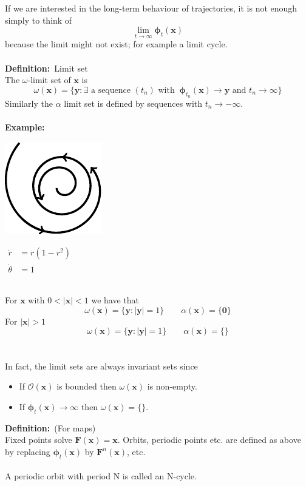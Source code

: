 \documentclass{article}
\newcommand{\cO}{\mathcal{O}}                               %
\newcommand{\example}{\textbf{Example:}}                    %
\newcommand{\definition}{\textbf{Definition:}}              %
\newcommand{\bp}{\bm{\phi}}                                 %
\begin{document}
\noindent If we are interested in the long-term behaviour of trajectories, it is not 
enough simply to think of 
\[ \lim_{t \to \infty} \bp_t(\bm{x}) \]
because the limit might not exist; for example a limit cycle.
\\
\\
\definition\ Limit set
\\
The $\omega$-limit set of $\bm{x}$ is 
\[ \omega (\bm{x}) = \{ \bm{y} : \exists \mbox{ a sequence } (t_n) \mbox{ with }\
 \bp_{t_n}(\bm{x}) \to \bm{y} \mbox{ and } t_n \to \infty \} \]
Similarly the $\alpha$ limit set is defined by sequences with $t_n \to - \infty$.
\\
\\
\example\ \\
\begin{minipage}[c][0.22\textwidth][c]{0.2\textwidth}
\end{minipage}
\hspace{0.2\textwidth}
\begin{minipage}[c][0.22\textwidth][c]{0.3\textwidth}
\begin{center}
\includegraphics{Fig5.pdf}
\end{center}
\end{minipage}
%
\begin{minipage}[c][0.22\textwidth][c]{0.3\textwidth}
\begin{center}
$ \begin{array}{rl}
\dot{r} &= r(1-r^2) \\
\dot{\theta} &= 1
\end{array}$
\end{center}
\end{minipage}
\\
%
For $\bm{x}$ with $0 < |\bm{x}| < 1$ we have that
\[ \omega ( \bm{x} ) = \{ \bm{y} : |\bm{y}| = 1 \}  \qquad  \alpha ( \bm{x} ) = \{\bm{0} \} \]
For $|\bm{x}|>1$
\[ \omega ( \bm{x} ) = \{ \bm{y} : |\bm{y}| = 1 \}  \qquad  \alpha ( \bm{x} ) = \{ \} \]
\\
\\
In fact, the limit sets are always invariant sets since
\begin{itemize}
\item If $\cO(\bm{x})$ is bounded then $\omega(\bm{x})$ is non-empty.
\item If $\bp_t(\bm{x}) \to \infty$ then $\omega(\bm{x}) = \{ \} $.
\end{itemize}\vspace{3mm}
\definition\ (For maps) 
\\
Fixed points solve $\bm{F}(\bm{x}) = \bm{x}$. Orbits, periodic points etc.
are defined as above by replacing $\bp_t(\bm{x})$ by $\bm{F}^n(\bm{x})$,
etc.
\\
\\
A periodic orbit with period N is called an N-cycle.
\end{document}
